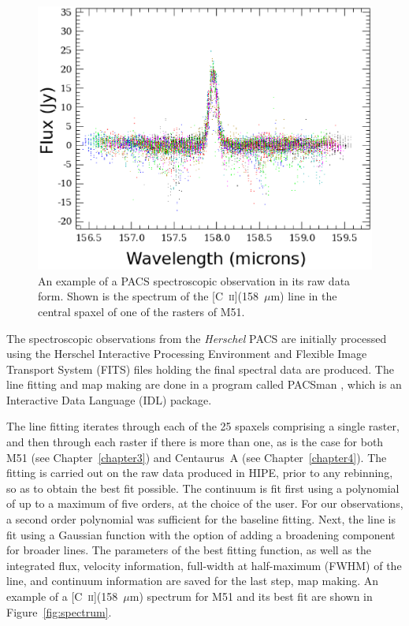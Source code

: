 \begin{figure}[!h]
 \begin{center}
 \includegraphics[width=\columnwidth]{ch1/M51_line_CII157.eps}
  \caption[Raw data cloud of a PACS \mbox{[C~\textsc{ii}](158~$\mu$m)} observation for M51]{An example of a PACS spectroscopic observation in its raw data form.  Shown is the spectrum of the [C~\textsc{ii}](158~$\mu$m) line in the central spaxel of one of the rasters of M51.
  \label{fig:data_cloud}}
 \end{center}
\end{figure}

The spectroscopic observations from the \emph{Herschel} PACS are initially processed using the Herschel Interactive Processing Environment \citep[HIPE; ][]{2010ASPC..434..139O} and Flexible Image Transport System (FITS) files holding the final spectral data are produced.  The line fitting and map making are done in a program called PACSman \citep{2012A&A...548A..91L}, which is an Interactive Data Language (IDL) package.

The line fitting iterates through each of the 25 spaxels comprising a single raster, and then through each raster if there is more than one, as is the case for both M51 (see Chapter~\ref{chapter3}) and Centaurus~A (see Chapter~\ref{chapter4}).  The fitting is carried out on the raw data produced in HIPE, prior to any rebinning, so as to obtain the best fit possible.  The continuum is fit first using a polynomial of up to a maximum of five orders, at the choice of the user.  For our observations, a second order polynomial was sufficient for the baseline fitting.  Next, the line is fit using a Gaussian function with the option of adding a broadening component for broader lines.  The parameters of the best fitting function, as well as the integrated flux, velocity information, full-width at half-maximum (FWHM) of the line, and continuum information are saved for the last step, map making.  An example of a [C~\textsc{ii}](158~$\mu$m) spectrum for M51 and its best fit are shown in Figure~\ref{fig:spectrum}.

